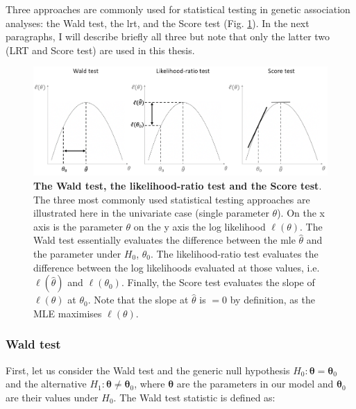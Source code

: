 
\vspace{5mm}

Three approaches are commonly used for statistical testing in genetic association analyses: the Wald test, the \gls{lrt}, and the Score test (Fig. \ref{fig:hypothesis_tests}).
In the next paragraphs, I will describe briefly all three but note that only the latter two (LRT and Score test) are used in this thesis.

\begin{figure}[h]
\centering
\includegraphics[width=15cm]{Chapter2/Fig/wald_lrt_score_tests.png}
\caption[Wald, LRT and Score test]{\textbf{The Wald test, the likelihood-ratio test and the Score test}.\\
The three most commonly used statistical testing approaches are illustrated here in the univariate case (single parameter $\theta$). 
On the x axis is the parameter $\theta$ on the y axis the log likelihood $\ell(\theta)$.
The Wald test essentially evaluates the difference between the \gls{mle} $\hat{\theta}$ and the parameter under $H_0$, $\theta_0$.
The likelihood-ratio test evaluates the difference between the log likelihoods evaluated at those values, i.e. $\ell(\hat{\theta})$ and $\ell(\theta_0)$.
Finally, the Score test evaluates the slope of $\ell(\theta)$ at $\theta_0$. Note that the slope at $\hat{\theta}$ is $=0$ by definition, as the MLE maximises $\ell(\theta)$.}
\label{fig:hypothesis_tests}
\end{figure}

\newpage

\subsubsection{Wald test}

First, let us consider the Wald test and the generic null hypothesis $H_0: \boldsymbol{\theta} = \boldsymbol{\theta}_0$ and the alternative $H_1: \boldsymbol{\theta} \neq \boldsymbol{\theta}_0$, where $\boldsymbol{\theta}$ are the parameters in our model and $\boldsymbol{\theta}_0$ are their values under $H_0$.
The Wald test statistic is defined as:

